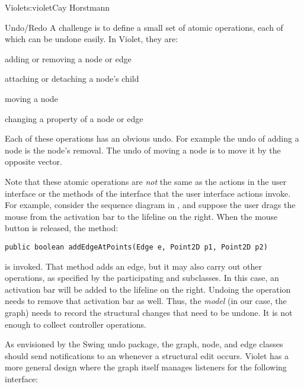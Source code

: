 \begin{aosachapter}{Violet}{s:violet}{Cay Horstmann}
\begin{aosasect1}{Undo/Redo}
A challenge is to define a small set of atomic operations, each of
which can be undone easily. In Violet, they are:

\begin{aosaitemize}

  \item adding or removing a node or edge

  \item attaching or detaching a node's child

  \item moving a node

  \item changing a property of a node or edge

\end{aosaitemize}

Each of these operations has an obvious undo. For example the undo of
adding a node is the node's removal. The undo of moving a node is to
move it by the opposite vector.


Note that these atomic operations are \emph{not} the same as the
actions in the user interface or the methods of the 
interface that the user interface actions invoke. For example,
consider the sequence diagram in ,
and suppose the user drags the mouse from the activation bar to the
lifeline on the right. When the mouse button is released, the method:

\begin{verbatim}
public boolean addEdgeAtPoints(Edge e, Point2D p1, Point2D p2)
\end{verbatim}

\noindent
is invoked. That method adds an edge, but it may also carry out other
operations, as specified by the participating  and
 subclasses. In this case, an activation bar will be added
to the lifeline on the right. Undoing the operation needs to remove
that activation bar as well. Thus, the \emph{model} (in our case, the
graph) needs to record the structural changes that need to be
undone. It is not enough to collect controller operations.

As envisioned by the Swing undo package, the graph, node, and edge
classes should send  notifications to an
 whenever a structural edit occurs. Violet has a
more general design where the graph itself manages listeners for the
following interface:


\end{aosasect1}
\end{aosachapter}

